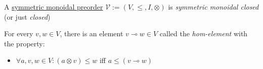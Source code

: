 A \href{doc/1 math/Seven Sketches in Compositionality/Chapter 2: Resource theories/2 Symmetric monoidal preorders/1 Definition and first examples/1 Symmetric monoidal structure on a preorder}{symmetric monoidal preorder} $\mathcal{V}:=(V,\leq,I,\otimes)$ is \emph{symmetric monoidal closed} (or just \emph{closed})

For every $v,w \in V$, there is an element $v \multimap w \in V$ called the \emph{hom-element} with the property:
\begin{itemize}
  \item  $\forall a,v,w \in V: (a \otimes v) \leq w$ iff $a \leq (v \multimap w)$
\end{itemize}
